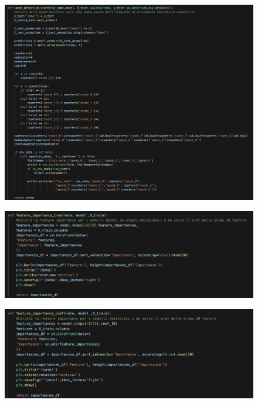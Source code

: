 \begin{appendices}
\begin{figure}[H]
    \centering
    \includegraphics[width=1\linewidth]{12.png}
    \label{fig:enter-label}
\end{figure}

\begin{figure}[H]
    \centering
    \includegraphics[width=1\linewidth]{13.png}
    \label{fig:enter-label}
\end{figure}

\begin{figure}[H]
    \centering
    \includegraphics[width=1\linewidth]{14.png}
    \label{fig:enter-label}
\end{figure}


\end{appendices}
